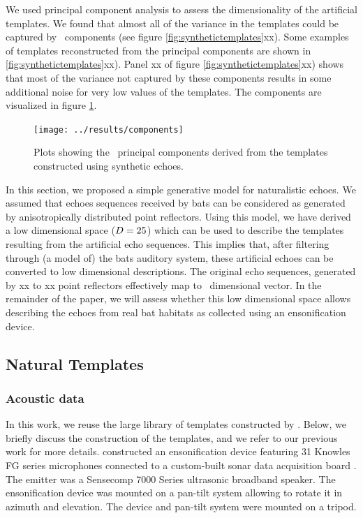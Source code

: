 \documentclass[preprint,5p]{elsarticle}
\begin{document}
We used principal component analysis to assess the dimensionality of the artificial templates. We found that almost all of the variance in the templates could be captured by \pca\ components (see figure \ref{fig:synthetictemplates}xx). Some examples of templates reconstructed from the principal components are shown in \ref{fig:synthetictemplates}xx). Panel xx of figure \ref{fig:synthetictemplates}xx) shows that most of the variance not captured by these components results in some additional noise for very low values of the templates. The components are visualized in figure \ref{fig:components}.

\begin{figure}
	\centering
	\texttt{[image: ../results/components]}
	\caption{Plots showing the \pca\ principal components derived from the templates constructed using synthetic echoes.}
	\label{fig:components}
\end{figure}

In this section, we proposed a simple generative model for naturalistic echoes. We assumed that echoes sequences received by bats can be considered as generated by anisotropically distributed point reflectors. Using this model, we have derived a low dimensional space ($D = 25$) which can be used to describe the templates resulting from the artificial echo sequences. This implies that, after filtering through (a model of) the bats auditory system, these artificial echoes can be converted to low dimensional descriptions. The original echo sequences, generated by xx to xx point reflectors effectively map to \pca\ dimensional vector. In the remainder of the paper, we will assess whether this low dimensional space allows describing the echoes from real bat habitats as collected using an ensonification device.

\subsection{Natural Templates}

\subsubsection{Acoustic data}

In this work, we reuse the large library of templates constructed by \citet{Vanderelst2016}. Below, we briefly discuss the construction of the templates, and we refer to our previous work for more details. \citet{Vanderelst2016} constructed an ensonification device featuring 31 Knowles FG series microphones connected to a custom-built sonar data acquisition board \citep{Steckel2013a}. The emitter was a Sensecomp 7000 Series ultrasonic broadband speaker. The ensonification device was mounted on a pan-tilt system allowing to rotate it in azimuth and elevation. The device and pan-tilt system were mounted on a tripod.
\end{document}
